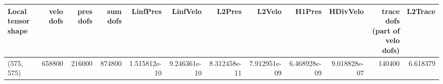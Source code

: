 \begin{tabular}{lrrrrrrrrrrr}
\toprule
Local tensor shape &  velo dofs &  pres dofs &  sum dofs &     LinfPres &     LinfVelo &       L2Pres &       L2Velo &       H1Pres &     HDivVelo &  trace dofs (part of velo dofs) &  L2Trace \\
\midrule
        (575, 575) &     658800 &     216000 &    874800 & 1.515812e-10 & 9.246361e-10 & 8.312458e-11 & 7.912951e-09 & 6.468928e-09 & 9.018828e-07 &                          140400 & 6.618379 \\
\bottomrule
\end{tabular}
